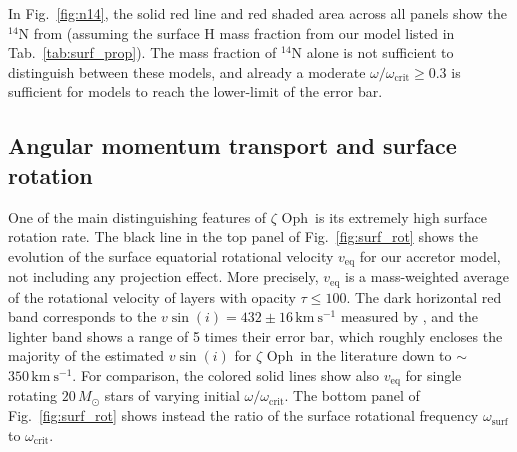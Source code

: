 \documentclass[twocolumn,twocolappendix,trackchanges]{aastex63}
\newcommand{\kms}{{\mathrm{km\ s^{-1}}}}
\DeclareRobustCommand{\Figref}[1]{Fig.~\ref{#1}}
\DeclareRobustCommand{\Tabref}[1]{Tab.~\ref{#1}}
\newcommand{\zoph}{$\zeta$ Oph}
\begin{document}
In \Figref{fig:n14}, the solid red line and red shaded area across all panels show the
$^{14}\mathrm{N}$ from  (assuming the
surface H mass fraction from our model listed in
\Tabref{tab:surf_prop}). The mass fraction of $^{14}\mathrm{N}$
alone is not sufficient to distinguish between these models, and already
a moderate $\omega/\omega_\mathrm{crit}\geq0.3$ is sufficient for
models to reach the lower-limit of the error bar.


\subsection{Angular momentum transport and surface rotation}
\label{sec:rot}

One of the main distinguishing features of \zoph\ is its extremely
high surface rotation rate.
The black line in the top panel of \Figref{fig:surf_rot} shows the
evolution of the surface equatorial rotational velocity
$v_\mathrm{eq}$ for our accretor model, not including any projection
effect. More precisely, $v_\mathrm{eq}$ is a mass-weighted average of
the rotational velocity of layers with opacity
$\tau\leq 100$. The dark horizontal red band corresponds to the
$v\sin(i)=432\pm16\,\kms$ measured by \cite{zehe:18}, and the lighter
band shows a range of 5 times their error bar, which roughly encloses
the majority of the estimated $v\sin(i)$ for \zoph\ in the literature
down to $\sim$$350\,\kms$.  For comparison, the colored solid lines show also
$v_\mathrm{eq}$ for single rotating
$20\,M_\odot$ stars of varying initial
$\omega/\omega_\mathrm{crit}$.  The bottom panel of \Figref{fig:surf_rot} shows instead the ratio
of the surface rotational frequency $\omega_\mathrm{surf}$ to $\omega_\mathrm{crit}$.
\end{document}
